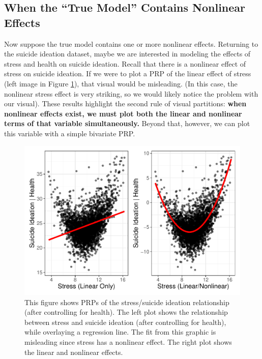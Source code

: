 \documentclass[
  man,floatsintext]{apa6}
\begin{document}
\subsection{When the ``True Model'' Contains Nonlinear Effects}\label{when-the-true-model-contains-nonlinear-effects}

Now suppose the true model contains one or more nonlinear effects. Returning to the suicide ideation dataset, maybe we are interested in modeling the effects of stress and health on suicide ideation. Recall that there is a nonlinear effect of stress on suicide ideation. If we were to plot a PRP of the linear effect of stress (left image in Figure \ref{fig:nonlinear}), that visual would be misleading. (In this case, the nonlinear stress effect is very striking, so we would likely notice the problem with our visual). These results highlight the second rule of visual partitions: \textbf{when nonlinear effects exist, we must plot both the linear and nonlinear terms of that variable simultaneously.} Beyond that, however, we can plot this variable with a simple bivariate PRP.

\begin{figure}
\centering
\includegraphics{visual_partitions_files/figure-latex/nonlinear-1.pdf}
\caption{\label{fig:nonlinear}This figure shows PRPs of the stress/suicide ideation relationship (after controlling for health). The left plot shows the relationship between stress and suicide ideation (after controlling for health), while overlaying a regression line. The fit from this graphic is misleading since stress has a nonlinear effect. The right plot shows the linear and nonlinear effects.}
\end{figure}
\end{document}
